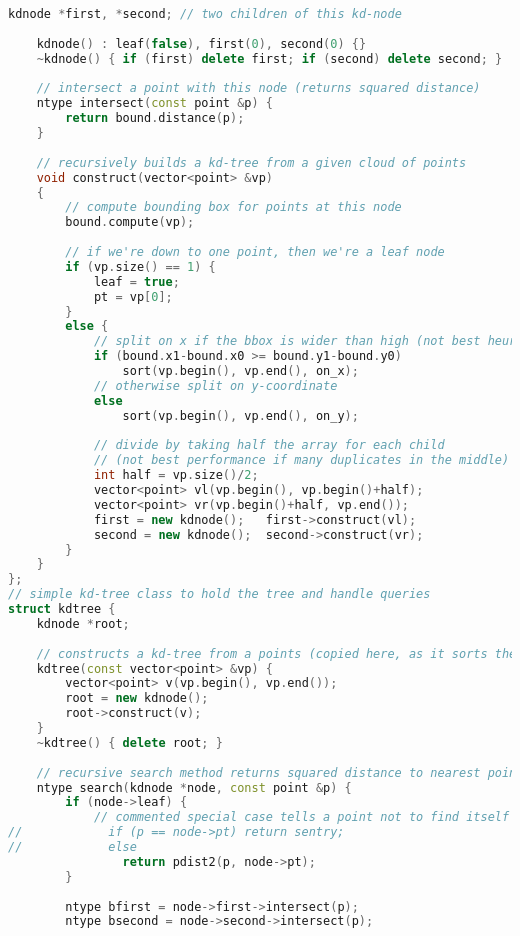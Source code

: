 \begin{lstlisting}[language=C++]
    kdnode *first, *second; // two children of this kd-node
    
    kdnode() : leaf(false), first(0), second(0) {}
    ~kdnode() { if (first) delete first; if (second) delete second; }
    
    // intersect a point with this node (returns squared distance)
    ntype intersect(const point &p) {
        return bound.distance(p);
    }
    
    // recursively builds a kd-tree from a given cloud of points
    void construct(vector<point> &vp)
    {
        // compute bounding box for points at this node
        bound.compute(vp);
        
        // if we're down to one point, then we're a leaf node
        if (vp.size() == 1) {
            leaf = true;
            pt = vp[0];
        }
        else {
            // split on x if the bbox is wider than high (not best heuristic...)
            if (bound.x1-bound.x0 >= bound.y1-bound.y0)
                sort(vp.begin(), vp.end(), on_x);
            // otherwise split on y-coordinate
            else
                sort(vp.begin(), vp.end(), on_y);
            
            // divide by taking half the array for each child
            // (not best performance if many duplicates in the middle)
            int half = vp.size()/2;
            vector<point> vl(vp.begin(), vp.begin()+half);
            vector<point> vr(vp.begin()+half, vp.end());
            first = new kdnode();   first->construct(vl);
            second = new kdnode();  second->construct(vr);            
        }
    }
};
// simple kd-tree class to hold the tree and handle queries
struct kdtree {
    kdnode *root;
    
    // constructs a kd-tree from a points (copied here, as it sorts them)
    kdtree(const vector<point> &vp) {
        vector<point> v(vp.begin(), vp.end());
        root = new kdnode();
        root->construct(v);
    }
    ~kdtree() { delete root; }
    
    // recursive search method returns squared distance to nearest point
    ntype search(kdnode *node, const point &p) {
        if (node->leaf) {
            // commented special case tells a point not to find itself
//            if (p == node->pt) return sentry;
//            else               
                return pdist2(p, node->pt);
        }
        
        ntype bfirst = node->first->intersect(p);
        ntype bsecond = node->second->intersect(p);
        

\end{lstlisting}
